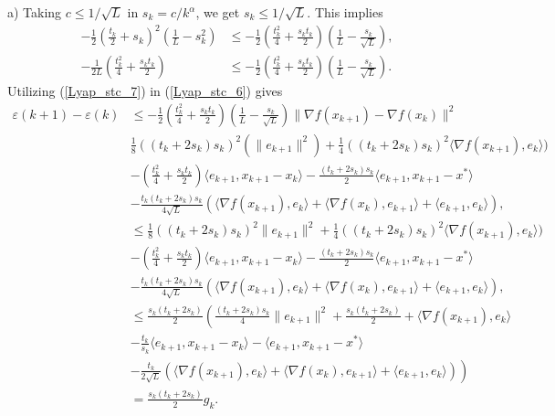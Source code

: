 \documentclass{article}
\theoremstyle{plain}
\theoremstyle{definition}
\theoremstyle{remark}
\begin{document}
        a) Taking $c\leq 1/\sqrt{L}$ in $s_k=c/k^{\alpha}$, we get $s_k\leq 1/\sqrt{L}$. This implies 
        \begin{align}\label{Lyap_stc_7}
            -\frac{1}{2}\left(\frac{t_k}{2}+s_k\right)^2(\frac{1}{L}-s_k^2)&\leq -\frac{1}{2}\left(\frac{t_k^2}{4}+\frac{s_kt_k}{2} \right)(\frac{1}{L}-\frac{s_k}{\sqrt{L}}),\nonumber\\
            -\frac{1}{2L}\left(\frac{t_{k}^2}{4}+\frac{s_{k}t_{k}}{2}\right)&\leq -\frac{1}{2}\left(\frac{t_k^2}{4}+\frac{s_kt_k}{2} \right)(\frac{1}{L}-\frac{s_k}{\sqrt{L}}).
        \end{align}
        Utilizing (\ref{Lyap_stc_7}) in (\ref{Lyap_stc_6}) gives
        \begin{align}\label{Lyap_stc_8}
            \varepsilon(k+1)-\varepsilon(k)&\leq -\frac{1}{2}\left(\frac{t_k^2}{4}+\frac{s_kt_k}{2} \right)(\frac{1}{L}-\frac{s_k}{\sqrt{L}})\|\nabla f(x_{k+1})-\nabla f(x_k)\|^2\nonumber\\
            &\frac{1}{8}((t_k+2s_k)s_k)^2(\|e_{k+1}\|^2)+\frac{1}{4}((t_k+2s_k)s_k)^2\langle \nabla f(x_{k+1}) ,e_k \rangle)\nonumber\\
         & -(\frac{t_k^2}{4}+\frac{s_kt_k}{2})\langle e_{k+1},x_{k+1}-x_k\rangle-\frac{(t_k+2s_k)s_k}{2}\langle e_{k+1},x_{k+1}-x^*\rangle\nonumber\\
         &-\frac{t_k(t_k+2s_k)s_k}{4\sqrt{L}}\left(\langle \nabla f(x_{k+1}),e_k \rangle+\langle \nabla f(x_{k}) , e_{k+1}\rangle+\langle e_{k+1},e_k\rangle\right),\nonumber\\
         &\leq \frac{1}{8}((t_k+2s_k)s_k)^2\|e_{k+1}\|^2+\frac{1}{4}((t_k+2s_k)s_k)^2\langle \nabla f(x_{k+1}) ,e_k \rangle)\nonumber\\
         & -(\frac{t_k^2}{4}+\frac{s_kt_k}{2})\langle e_{k+1},x_{k+1}-x_k\rangle-\frac{(t_k+2s_k)s_k}{2}\langle e_{k+1},x_{k+1}-x^*\rangle\nonumber\\
         &-\frac{t_k(t_k+2s_k)s_k}{4\sqrt{L}}\left(\langle \nabla f(x_{k+1}),e_k \rangle+\langle \nabla f(x_{k}) , e_{k+1}\rangle+\langle e_{k+1},e_k\rangle\right),\nonumber\\
         &\leq \frac{s_k(t_k+2s_k)}{2}\left(\frac{(t_k+2s_k)s_k}{4}\|e_{k+1}\|^2+\frac{s_k(t_k+2s_k)}{2}+\langle \nabla f(x_{k+1}) ,e_k \rangle\right.\nonumber\\
         &-\frac{t_k}{s_k}\langle e_{k+1},x_{k+1}-x_k\rangle-\langle e_{k+1},x_{k+1}-x^*\rangle\nonumber\\
         &\left.-\frac{t_k}{2\sqrt{L}}\left(\langle \nabla f(x_{k+1}),e_k \rangle+\langle \nabla f(x_{k}) , e_{k+1}\rangle+\langle e_{k+1},e_k\rangle\right)\right)\nonumber\\
         &=\frac{s_k(t_k+2s_k)}{2}g_k.
        \end{align}
\end{document}
